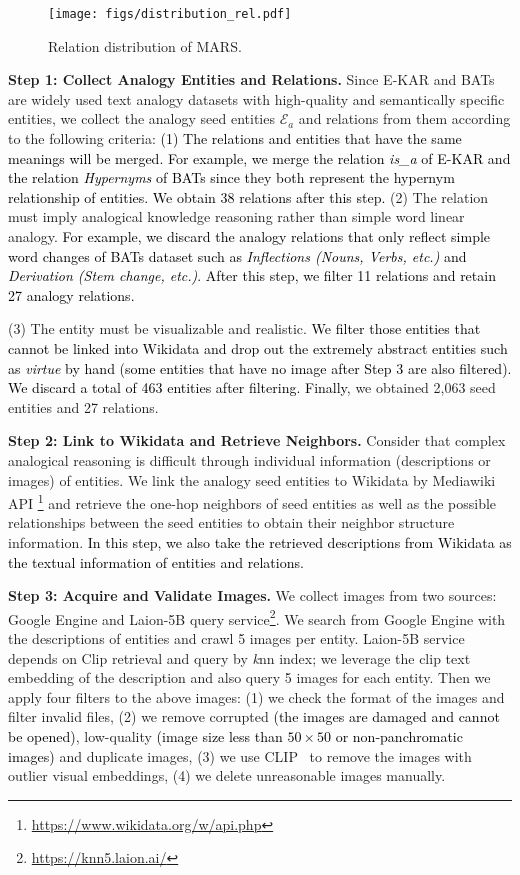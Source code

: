 \documentclass{article} \usepackage{iclr2023_conference,times}
\newcommand{\data}{MARS}
\begin{document}
\begin{figure}[!htp]
\centering
\texttt{[image: figs/distribution\_rel.pdf]}
\caption{Relation distribution of {\data}.}
\label{fig:adx_dis_rel}
\end{figure}

\textbf{Step 1: Collect Analogy Entities and Relations.} 
Since E-KAR and BATs are widely used text analogy datasets with high-quality and semantically specific entities, we collect the analogy seed entities $\mathcal{E}_a$ and relations from them according to the following criteria: 
\textcolor{black}{
(1) The relations and entities that have the same meanings will be merged. For example, we merge the relation \textit{is\_a} of E-KAR and the relation \textit{Hypernyms} of BATs since they both represent the hypernym relationship     of entities. We obtain 38 relations after this step.}
(2) The relation must imply analogical knowledge reasoning rather than simple word linear analogy. \textcolor{black}{For example, we discard the analogy relations that only reflect simple word changes of BATs dataset such as \textit{Inflections (Nouns, Verbs, etc.)} and \textit{Derivation (Stem change, etc.)}. After this step, we filter 11 relations and retain 27 analogy relations.}

(3) The entity must be visualizable and realistic. \textcolor{black}{We filter those entities that cannot be linked into Wikidata and drop out the extremely abstract entities such as \textit{virtue} by hand (some entities that have no image after Step 3 are also filtered). We discard a total of 463 entities after filtering. Finally}, we obtained 2,063 seed entities and 27 relations.


\textbf{Step 2: Link to Wikidata and Retrieve Neighbors.} 
Consider that complex analogical reasoning is difficult through individual information (descriptions or images) of entities. 
We link the analogy seed entities to Wikidata by Mediawiki API \footnote{\url{https://www.wikidata.org/w/api.php}} and retrieve the one-hop neighbors of seed entities as well as the possible relationships between the seed entities to obtain their neighbor structure information. \textcolor{black}{In this step, we also take the retrieved descriptions from Wikidata as the textual information of entities and relations.
}

\textbf{Step 3: Acquire and Validate Images.}
We collect images from two sources: Google Engine and Laion-5B query service\footnote{\url{https://knn5.laion.ai/}}. We search from Google Engine with the descriptions of entities and crawl 5 images per entity. 
Laion-5B service depends on Clip retrieval and query by \textit{k}nn index; we leverage the clip text embedding of the description and also query 5 images for each entity. 
Then we apply four filters to the above images: 
(1) we check the format of the images and filter invalid files, 
(2) we remove corrupted \textcolor{black}{(the images are damaged and cannot be opened)}, low-quality \textcolor{black}{(image size less than $50\times50$ or non-panchromatic images)} and duplicate images, 
(3) we use CLIP~\citep{CLIP} to remove the images with outlier visual embeddings,
(4) we delete unreasonable images manually. 
\end{document}
